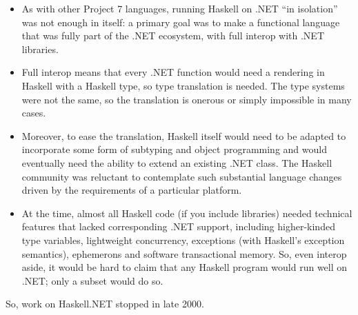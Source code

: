 \documentclass[acmsmall,screen]{acmart}
\begin{document}
\begin{itemize}
\item As with other Project 7 languages, running Haskell on .NET “in isolation” was not enough in itself: a primary goal was to make a functional language that
was fully part of the .NET ecosystem, with full interop with .NET libraries. 
\item Full interop means that every .NET function would need a rendering in Haskell with a Haskell type, so type translation is needed. The type systems
were not the same, so the translation is onerous or simply impossible in many cases.  
\item Moreover, to ease the translation, Haskell itself would need to be adapted to incorporate some form of subtyping and object programming and would
eventually need the ability to extend an existing .NET class.   The Haskell community was reluctant to contemplate such substantial language changes driven
by the requirements of a particular platform. 
\item At the time, almost all Haskell code (if you include libraries) needed technical features that lacked corresponding .NET support, including higher-kinded
type variables, lightweight concurrency, exceptions (with Haskell’s exception semantics), ephemerons and software transactional memory. So, even interop
aside, it would be hard to claim that any Haskell program would run well on .NET; only a subset would do so.   
\end{itemize}
So, work on Haskell.NET stopped in late 2000.
\end{document}
